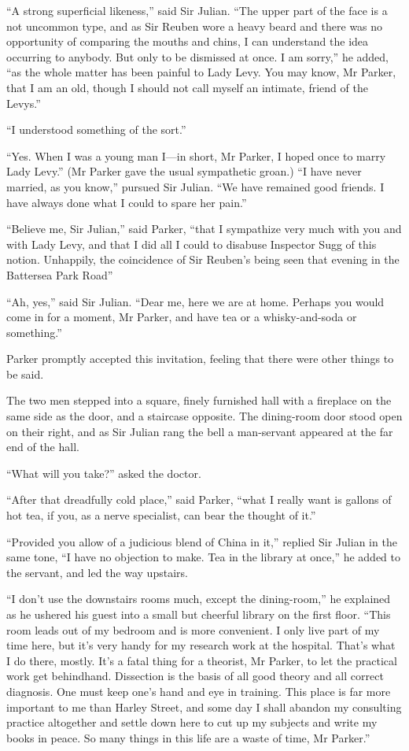 \enquote{A strong superficial likeness,} said Sir Julian. \enquote{The upper part of the face is a not uncommon type, and as Sir Reuben wore a heavy beard and there was no opportunity of comparing the mouths and chins, I can understand the idea occurring to anybody. But only to be dismissed at once. I am sorry,} he added, \enquote{as the whole matter has been painful to Lady Levy. You may know, Mr Parker, that I am an old, though I should not call myself an intimate, friend of the Levys.}

\enquote{I understood something of the sort.}

\enquote{Yes. When I was a young man I\allowbreak---\allowbreak in short, Mr Parker, I hoped once to marry Lady Levy.} (Mr Parker gave the usual sympathetic groan.) \enquote{I have never married, as you know,} pursued Sir Julian. \enquote{We have remained good friends. I have always done what I could to spare her pain.}

\enquote{Believe me, Sir Julian,} said Parker, \enquote{that I sympathize very much with you and with Lady Levy, and that I did all I could to disabuse Inspector Sugg of this notion. Unhappily, the coincidence of Sir Reuben’s being seen that evening in the Battersea Park Road\longdash}

\enquote{Ah, yes,} said Sir Julian. \enquote{Dear me, here we are at home. Perhaps you would come in for a moment, Mr Parker, and have tea or a whisky-and-soda or something.}

Parker promptly accepted this invitation, feeling that there were other things to be said.

The two men stepped into a square, finely furnished hall with a fireplace on the same side as the door, and a staircase opposite. The dining-room door stood open on their right, and as Sir Julian rang the bell a man-servant appeared at the far end of the hall.

\enquote{What will you take?} asked the doctor.

\enquote{After that dreadfully cold place,} said Parker, \enquote{what I really want is gallons of hot tea, if you, as a nerve specialist, can bear the thought of it.}

\enquote{Provided you allow of a judicious blend of China in it,} replied Sir Julian in the same tone, \enquote{I have no objection to make. Tea in the library at once,} he added to the servant, and led the way upstairs.

\enquote{I don’t use the downstairs rooms much, except the dining-room,} he explained as he ushered his guest into a small but cheerful library on the first floor. \enquote{This room leads out of my bedroom and is more convenient. I only live part of my time here, but it’s very handy for my research work at the hospital. That’s what I do there, mostly. It’s a fatal thing for a theorist, Mr Parker, to let the practical work get behindhand. Dissection is the basis of all good theory and all correct diagnosis. One must keep one’s hand and eye in training. This place is far more important to me than Harley Street, and some day I shall abandon my consulting practice altogether and settle down here to cut up my subjects and write my books in peace. So many things in this life are a waste of time, Mr Parker.}

